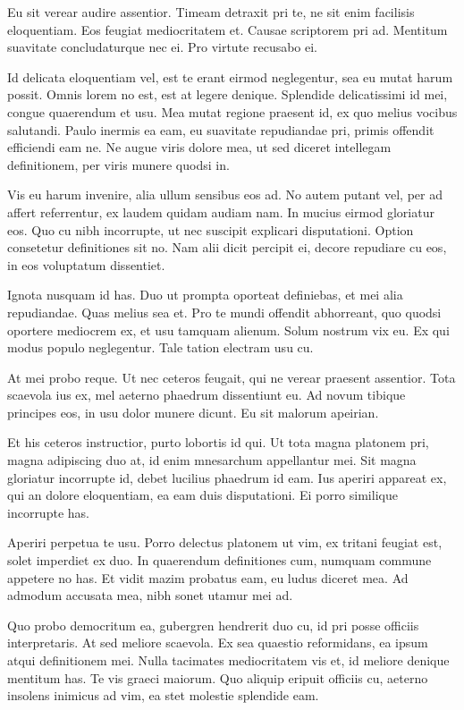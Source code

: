 \documentclass[
	12pt,				%
	openright,			%
	oneside,			%
	a4paper,			%
	english,			%
	french,				%
	spanish,			%
	brazil,				%
	]{abntex2}
\begin{document}
Eu sit verear audire assentior. Timeam detraxit pri te, ne sit enim facilisis eloquentiam. Eos feugiat mediocritatem et. Causae scriptorem pri ad. Mentitum suavitate concludaturque nec ei. Pro virtute recusabo ei.

Id delicata eloquentiam vel, est te erant eirmod neglegentur, sea eu mutat harum possit. Omnis lorem no est, est at legere denique. Splendide delicatissimi id mei, congue quaerendum et usu. Mea mutat regione praesent id, ex quo melius vocibus salutandi. Paulo inermis ea eam, eu suavitate repudiandae pri, primis offendit efficiendi eam ne. Ne augue viris dolore mea, ut sed diceret intellegam definitionem, per viris munere quodsi in.

Vis eu harum invenire, alia ullum sensibus eos ad. No autem putant vel, per ad affert referrentur, ex laudem quidam audiam nam. In mucius eirmod gloriatur eos. Quo cu nibh incorrupte, ut nec suscipit explicari disputationi. Option consetetur definitiones sit no. Nam alii dicit percipit ei, decore repudiare cu eos, in eos voluptatum dissentiet.

Ignota nusquam id has. Duo ut prompta oporteat definiebas, et mei alia repudiandae. Quas melius sea et. Pro te mundi offendit abhorreant, quo quodsi oportere mediocrem ex, et usu tamquam alienum. Solum nostrum vix eu. Ex qui modus populo neglegentur. Tale tation electram usu cu.

At mei probo reque. Ut nec ceteros feugait, qui ne verear praesent assentior. Tota scaevola ius ex, mel aeterno phaedrum dissentiunt eu. Ad novum tibique principes eos, in usu dolor munere dicunt. Eu sit malorum apeirian.

Et his ceteros instructior, purto lobortis id qui. Ut tota magna platonem pri, magna adipiscing duo at, id enim mnesarchum appellantur mei. Sit magna gloriatur incorrupte id, debet lucilius phaedrum id eam. Ius aperiri appareat ex, qui an dolore eloquentiam, ea eam duis disputationi. Ei porro similique incorrupte has.

Aperiri perpetua te usu. Porro delectus platonem ut vim, ex tritani feugiat est, solet imperdiet ex duo. In quaerendum definitiones cum, numquam commune appetere no has. Et vidit mazim probatus eam, eu ludus diceret mea. Ad admodum accusata mea, nibh sonet utamur mei ad.

Quo probo democritum ea, gubergren hendrerit duo cu, id pri posse officiis interpretaris. At sed meliore scaevola. Ex sea quaestio reformidans, ea ipsum atqui definitionem mei. Nulla tacimates mediocritatem vis et, id meliore denique mentitum has. Te vis graeci maiorum. Quo aliquip eripuit officiis cu, aeterno insolens inimicus ad vim, ea stet molestie splendide eam.
\end{document}

